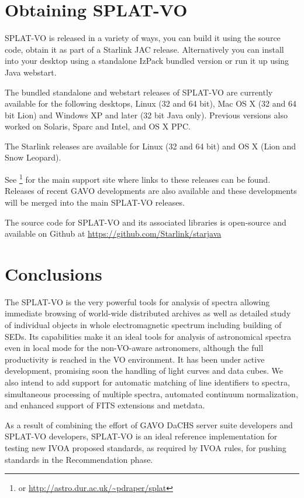 \documentclass[final,authoryear,5p,times,twocolumn]{elsarticle}
\begin{document}
\section{Obtaining SPLAT-VO}

SPLAT-VO is released in a variety of ways, you can build it using the source
code, obtain it as part of a Starlink JAC release. Alternatively you can
install into your desktop using a standalone IzPack bundled version or run it
up using Java webstart.

The bundled standalone and webstart releases of SPLAT-VO are currently
available for the following desktops, Linux (32 and 64 bit), Mac OS X (32 and
64 bit Lion) and Windows XP and later (32 bit Java only). Previous versions
also worked on Solaris, Sparc and Intel, and OS X PPC.

The Starlink releases
\citep[e.g.,][]{currie_adassxxiii,2013ASPC..475..247B} are available
for Linux (32 and 64 bit) and OS X (Lion and Snow Leopard).

See \footnote{or \url{http://astro.dur.ac.uk/~pdraper/splat}}
for the main support site where links to these releases can be found.
Releases of recent GAVO developments are also available and these
developments will be merged into the main SPLAT-VO releases.

The source code for SPLAT-VO and its associated libraries is
open-source and available on Github at
\url{https://github.com/Starlink/starjava}


\section{Conclusions}

The SPLAT-VO is the very powerful tools for analysis of spectra
allowing immediate browsing of world-wide distributed archives as well
as detailed study of individual objects in whole electromagnetic
spectrum including building of SEDs. Its capabilities make it an
ideal tools for analysis of astronomical spectra even in local mode
for the non-VO-aware astronomers, although the full productivity is
reached in the VO environment. It has been under active development, promising soon the handling of
light curves and data cubes. We also intend to add support for
automatic matching of line identifiers to spectra, simultaneous
processing of multiple spectra, automated continuum normalization, and
enhanced support of FITS extensions and metdata.

As a result of combining the effort of GAVO DaCHS server suite
developers and SPLAT-VO developers, SPLAT-VO is an ideal reference
implementation for testing new IVOA proposed standards, as required by
IVOA rules, for pushing standards in the Recommendation phase.
\end{document}
